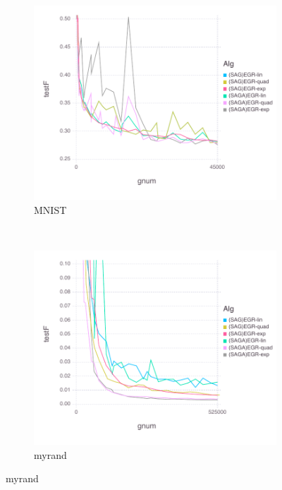 \documentclass[11pt]{article}
\begin{document}
      \begin{figure}[H]
          \centering
          \begin{subfigure}[b]{0.45\textwidth}
              \includegraphics[width=\textwidth]{Figures/MNISTBLtrueFfFinal-1.pdf}
              \caption{MNIST}
          \end{subfigure}
          ~ %
            \begin{subfigure}[b]{0.45\textwidth}
           \includegraphics[width=\textwidth]{Figures/myrandBLtrueFfFinal-1.pdf}
                \caption{myrand}
            \end{subfigure} 
			

\end{figure}
\end{document}
